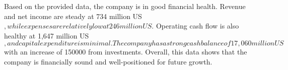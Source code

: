 

Based on the provided data, the company is in good financial health. Revenue and net income are steady at 734 million US$, while expenses are relatively low at 246 million US$. Operating cash flow is also healthy at 1,647 million US$, and capital expenditure is minimal. The company has a strong cash balance of 17,060 million US$ with an increase of 150000 from investments. Overall, this data shows that the company is financially sound and well-positioned for future growth.